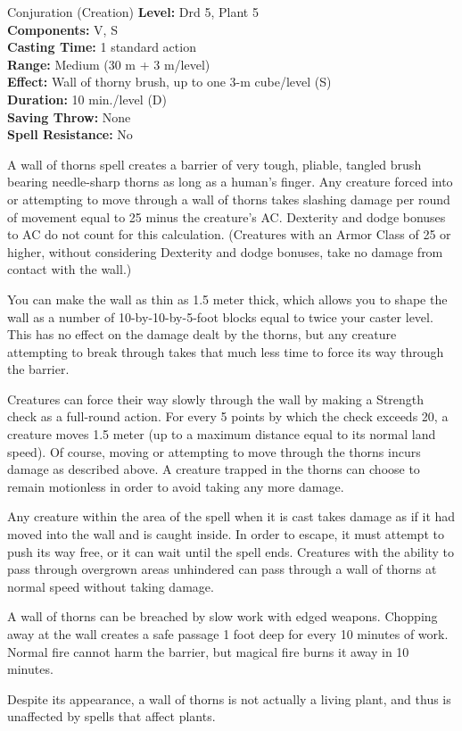 {Conjuration (Creation)}
{
	\textbf{Level:}
	Drd 5, Plant 5\\
	\textbf{Components:}
	V, S\\
	\textbf{Casting Time:}
	1 standard action\\
	\textbf{Range:}
	Medium (30 m + 3 m/level)\\
	\textbf{Effect:}
	Wall of thorny brush, up to one 3-m cube/level (S)\\
	\textbf{Duration:}
	10 min./level (D)\\
	\textbf{Saving Throw:}
	None\\
	\textbf{Spell Resistance:}
	No\\
}
{
	A wall of thorns spell creates a barrier of very tough, pliable, tangled brush bearing needle-sharp thorns as long as a human's finger. Any creature forced into or attempting to move through a wall of thorns takes slashing damage per round of movement equal to 25 minus the creature's AC. Dexterity and dodge bonuses to AC do not count for this calculation. (Creatures with an Armor Class of 25 or higher, without considering Dexterity and dodge bonuses, take no damage from contact with the wall.)

	You can make the wall as thin as 1.5 meter thick, which allows you to shape the wall as a number of 10-by-10-by-5-foot blocks equal to twice your caster level. This has no effect on the damage dealt by the thorns, but any creature attempting to break through takes that much less time to force its way through the barrier.

	Creatures can force their way slowly through the wall by making a Strength check as a full-round action. For every 5 points by which the check exceeds 20, a creature moves 1.5 meter (up to a maximum distance equal to its normal land speed). Of course, moving or attempting to move through the thorns incurs damage as described above. A creature trapped in the thorns can choose to remain motionless in order to avoid taking any more damage.

	Any creature within the area of the spell when it is cast takes damage as if it had moved into the wall and is caught inside. In order to escape, it must attempt to push its way free, or it can wait until the spell ends. Creatures with the ability to pass through overgrown areas unhindered can pass through a wall of thorns at normal speed without taking damage.

	A wall of thorns can be breached by slow work with edged weapons. Chopping away at the wall creates a safe passage 1 foot deep for every 10 minutes of work. Normal fire cannot harm the barrier, but magical fire burns it away in 10 minutes.

	Despite its appearance, a wall of thorns is not actually a living plant, and thus is unaffected by spells that affect plants.

}
